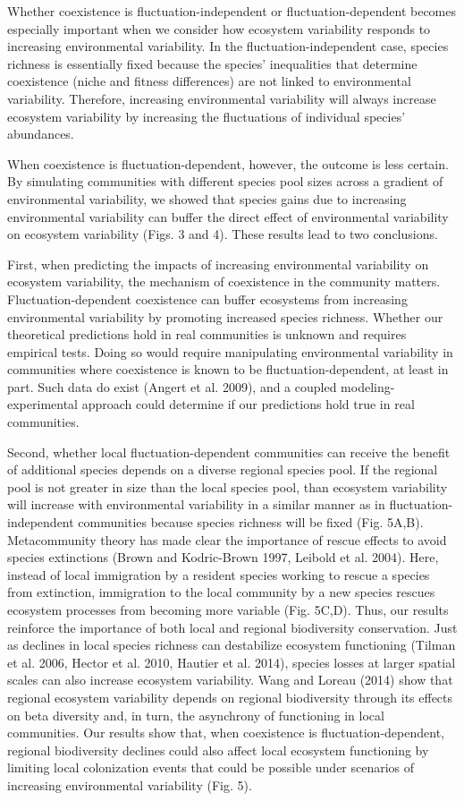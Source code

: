 \documentclass[12pt,]{article}
\begin{document}
Whether coexistence is fluctuation-independent or fluctuation-dependent
becomes especially important when we consider how ecosystem variability
responds to increasing environmental variability. In the
fluctuation-independent case, species richness is essentially fixed
because the species' inequalities that determine coexistence (niche and
fitness differences) are not linked to environmental variability.
Therefore, increasing environmental variability will always increase
ecosystem variability by increasing the fluctuations of individual
species' abundances.

When coexistence is fluctuation-dependent, however, the outcome is less
certain. By simulating communities with different species pool sizes
across a gradient of environmental variability, we showed that species
gains due to increasing environmental variability can buffer the direct
effect of environmental variability on ecosystem variability (Figs. 3
and 4). These results lead to two conclusions.

First, when predicting the impacts of increasing environmental
variability on ecosystem variability, the mechanism of coexistence in
the community matters. Fluctuation-dependent coexistence can buffer
ecosystems from increasing environmental variability by promoting
increased species richness. Whether our theoretical predictions hold in
real communities is unknown and requires empirical tests. Doing so would
require manipulating environmental variability in communities where
coexistence is known to be fluctuation-dependent, at least in part. Such
data do exist (Angert et al. 2009), and a coupled modeling-experimental
approach could determine if our predictions hold true in real
communities.

Second, whether local fluctuation-dependent communities can receive the
benefit of additional species depends on a diverse regional species
pool. If the regional pool is not greater in size than the local species
pool, than ecosystem variability will increase with environmental
variability in a similar manner as in fluctuation-independent
communities because species richness will be fixed (Fig. 5A,B).
Metacommunity theory has made clear the importance of rescue effects to
avoid species extinctions (Brown and Kodric-Brown 1997, Leibold et al.
2004). Here, instead of local immigration by a resident species working
to rescue a species from extinction, immigration to the local community
by a new species rescues ecosystem processes from becoming more variable
(Fig. 5C,D). Thus, our results reinforce the importance of both local
and regional biodiversity conservation. Just as declines in local
species richness can destabilize ecosystem functioning (Tilman et al.
2006, Hector et al. 2010, Hautier et al. 2014), species losses at larger
spatial scales can also increase ecosystem variability. Wang and Loreau
(2014) show that regional ecosystem variability depends on regional
biodiversity through its effects on beta diversity and, in turn, the
asynchrony of functioning in local communities. Our results show that,
when coexistence is fluctuation-dependent, regional biodiversity
declines could also affect local ecosystem functioning by limiting local
colonization events that could be possible under scenarios of increasing
environmental variability (Fig. 5).
\end{document}
